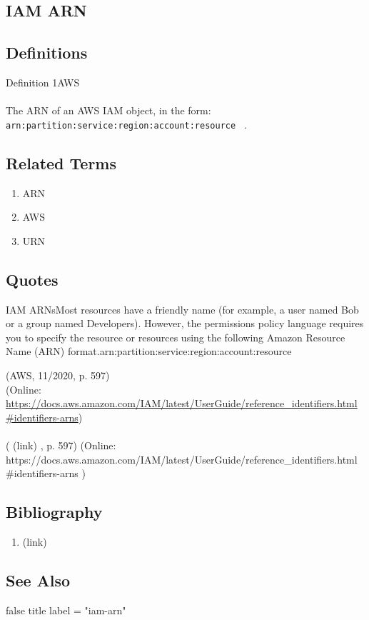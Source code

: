 \newpage \subsection*{IAM ARN } \subsection*{Definitions } \begin{DIC_Def}{Definition 1AWS }{} \paragraph{} The ARN of an AWS IAM object, in the form:  \texttt{ arn:partition:service:region:account:resource  } .  \end{DIC_Def} \subsection*{Related Terms } \begin{enumerate} \item  ARN  \item  AWS  \item  URN  \end{enumerate} \subsection*{Quotes } \begin{DIC_BlockQuote} IAM ARNsMost resources have a friendly name (for example, a user named Bob or a group named Developers). However, the permissions policy language requires you to specify the resource or resources using the following Amazon Resource Name (ARN) format.arn:partition:service:region:account:resource  \end{DIC_BlockQuote} (AWS, 11/2020, p. 597)\\ (Online: \url{https://docs.aws.amazon.com/IAM/latest/UserGuide/reference_identifiers.html\#identifiers-arns})  \paragraph{} (  (link) \href{AWS, 11/2020 }{ } , p. 597)  (Online:  https://docs.aws.amazon.com/IAM/latest/UserGuide/reference\_identifiers.html\#identifiers-arns  )  \subsection*{Bibliography } \begin{enumerate} \item  (link) \href{AWS, 11/2020 }{ }   \end{enumerate} \subsection*{See Also } false  title  label = "iam-arn"  